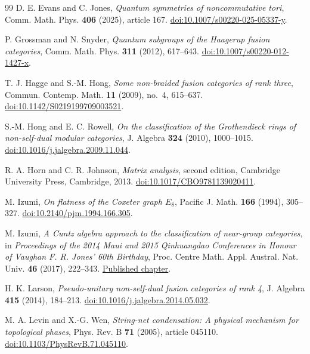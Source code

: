 \documentclass[11pt]{amsart}
\theoremstyle{definition}
\numberwithin{equation}{section}
\begin{document}
\begin{thebibliography}{99}
D. E. Evans and C. Jones,
\emph{Quantum symmetries of noncommutative tori},
Comm. Math. Phys. \textbf{406} (2025), article 167.
\href{https://doi.org/10.1007/s00220-025-05337-y}{doi:10.1007/s00220-025-05337-y}.

P. Grossman and N. Snyder,
\emph{Quantum subgroups of the Haagerup fusion categories},
Comm. Math. Phys. \textbf{311} (2012), 617--643.
\href{https://doi.org/10.1007/s00220-012-1427-x}{doi:10.1007/s00220-012-1427-x}.

T. J. Hagge and S.-M. Hong,
\emph{Some non-braided fusion categories of rank three},
Commun. Contemp. Math. \textbf{11} (2009), no.~4, 615--637.
\href{https://doi.org/10.1142/S0219199709003521}{doi:10.1142/S0219199709003521}.

S.-M. Hong and E. C. Rowell,
\emph{On the classification of the Grothendieck rings of non-self-dual modular categories},
J. Algebra \textbf{324} (2010), 1000--1015.
\href{https://doi.org/10.1016/j.jalgebra.2009.11.044}{doi:10.1016/j.jalgebra.2009.11.044}.

R. A. Horn and C. R. Johnson,
\emph{Matrix analysis}, second edition,
Cambridge University Press, Cambridge, 2013.
\href{https://doi.org/10.1017/CBO9781139020411}{doi:10.1017/CBO9781139020411}.

M. Izumi,
\emph{On flatness of the Coxeter graph $E_8$},
Pacific J. Math. \textbf{166} (1994), 305--327.
\href{https://doi.org/10.2140/pjm.1994.166.305}{doi:10.2140/pjm.1994.166.305}.

M. Izumi,
\emph{A Cuntz algebra approach to the classification of near-group categories},
in \emph{Proceedings of the 2014 Maui and 2015 Qinhuangdao Conferences in Honour of
Vaughan F. R. Jones' 60th Birthday},
Proc. Centre Math. Appl. Austral. Nat. Univ. \textbf{46} (2017), 222--343.
\href{https://maths.anu.edu.au/files/8\%2520Izumi_2.pdf}{Published chapter}.

H. K. Larson,
\emph{Pseudo-unitary non-self-dual fusion categories of rank 4},
J. Algebra \textbf{415} (2014), 184--213.
\href{https://doi.org/10.1016/j.jalgebra.2014.05.032}{doi:10.1016/j.jalgebra.2014.05.032}.

M. A. Levin and X.-G. Wen,
\emph{String-net condensation: A physical mechanism for topological phases},
Phys. Rev. B \textbf{71} (2005), article 045110.
\href{https://doi.org/10.1103/PhysRevB.71.045110}{doi:10.1103/PhysRevB.71.045110}.


\end{thebibliography}
\end{document}
